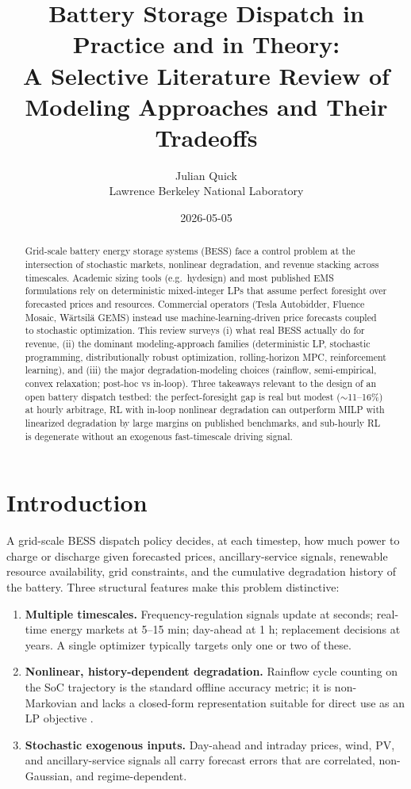 \documentclass[11pt]{article}
\title{Battery Storage Dispatch in Practice and in Theory:\\
A Selective Literature Review of Modeling Approaches and Their Tradeoffs}
\author{Julian Quick \\ \small{Lawrence Berkeley National Laboratory}}
\date{2026-05-05}
\begin{document}
\maketitle

\begin{abstract}
Grid-scale battery energy storage systems (BESS) face a control problem at the intersection of stochastic markets, nonlinear degradation, and revenue stacking across timescales. Academic sizing tools (e.g.\ hydesign) and most published EMS formulations rely on deterministic mixed-integer LPs that assume perfect foresight over forecasted prices and resources. Commercial operators (Tesla Autobidder, Fluence Mosaic, W\"{a}rtsil\"{a} GEMS) instead use machine-learning-driven price forecasts coupled to stochastic optimization. This review surveys (i) what real BESS actually do for revenue, (ii) the dominant modeling-approach families (deterministic LP, stochastic programming, distributionally robust optimization, rolling-horizon MPC, reinforcement learning), and (iii) the major degradation-modeling choices (rainflow, semi-empirical, convex relaxation; post-hoc vs in-loop). Three takeaways relevant to the design of an open battery dispatch testbed: the perfect-foresight gap is real but modest (\(\sim\)11--16\%) at hourly arbitrage, RL with in-loop nonlinear degradation can outperform MILP with linearized degradation by large margins on published benchmarks, and sub-hourly RL is degenerate without an exogenous fast-timescale driving signal.
\end{abstract}

\section{Introduction}

A grid-scale BESS dispatch policy decides, at each timestep, how much power to charge or discharge given forecasted prices, ancillary-service signals, renewable resource availability, grid constraints, and the cumulative degradation history of the battery. Three structural features make this problem distinctive:

\begin{enumerate}
\item \textbf{Multiple timescales.} Frequency-regulation signals update at seconds; real-time energy markets at 5--15 min; day-ahead at 1 h; replacement decisions at years. A single optimizer typically targets only one or two of these.
\item \textbf{Nonlinear, history-dependent degradation.} Rainflow cycle counting on the SoC trajectory is the standard offline accuracy metric; it is non-Markovian and lacks a closed-form representation suitable for direct use as an LP objective \citep{xu2018modeling, shi2017convex}.
\item \textbf{Stochastic exogenous inputs.} Day-ahead and intraday prices, wind, PV, and ancillary-service signals all carry forecast errors that are correlated, non-Gaussian, and regime-dependent.
\end{enumerate}
\end{document}
